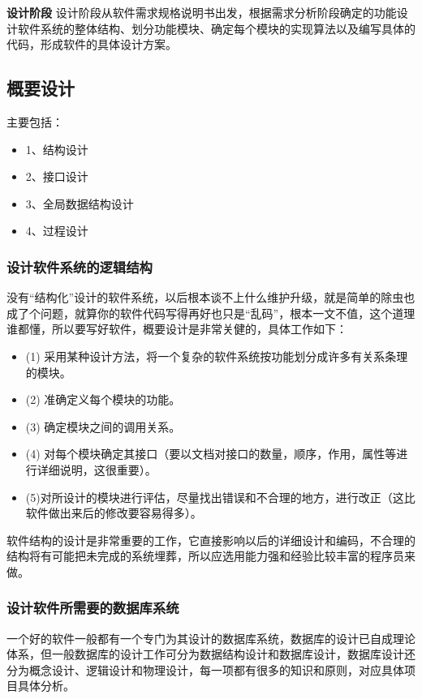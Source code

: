 \documentclass[UTF8,nofonts]{ctexart}
\makeatletter
\renewcommand{\section}{\@startsection{section}{1}{0mm}
  {-\baselineskip}{0.5\baselineskip}{\fontsize{16pt}{16pt}\bf\leftline}}
\makeatother
\begin{document}
\section{\textbf{设计阶段}}
设计阶段从软件需求规格说明书出发，根据需求分析阶段确定的功能设计软件系统的整体结构、划分功能模块、确定每个模块的实现算法以及编写具体的代码，形成软件的具体设计方案。
\subsection{\textbf{概要设计}}
主要包括：
\begin{itemize}
 \setlength{\itemsep}{0pt}
 \setlength{\parskip}{0pt}
 \setlength{\parsep}{0pt}
\item 1、结构设计
\item 2、接口设计
\item	3、全局数据结构设计
\item 4、过程设计
\end{itemize}
\subsubsection{\textbf{设计软件系统的逻辑结构}}
没有“结构化”设计的软件系统，以后根本谈不上什么维护升级，就是简单的除虫也成了个问题，就算你的软件代码写得再好也只是“乱码”，根本一文不值，这个道理谁都懂，所以要写好软件，概要设计是非常关健的，具体工作如下：
\begin{itemize}
 \setlength{\itemsep}{0pt}
 \setlength{\parskip}{0pt}
 \setlength{\parsep}{0pt}
\item (1) 采用某种设计方法，将一个复杂的软件系统按功能划分成许多有关系条理的模块。
\item (2) 准确定义每个模块的功能。
\item (3) 确定模块之间的调用关系。
\item (4) 对每个模块确定其接口（要以文档对接口的数量，顺序，作用，属性等进行详细说明，这很重要）。
\item (5)对所设计的模块进行评估，尽量找出错误和不合理的地方，进行改正（这比软件做出来后的修改要容易得多）。
\end{itemize}
软件结构的设计是非常重要的工作，它直接影响以后的详细设计和编码，不合理的结构将有可能把未完成的系统埋葬，所以应选用能力强和经验比较丰富的程序员来做。
\subsubsection{\textbf{设计软件所需要的数据库系统}}
一个好的软件一般都有一个专门为其设计的数据库系统，数据库的设计已自成理论体系，但一般数据库的设计工作可分为数据结构设计和数据库设计，数据库设计还分为概念设计、逻辑设计和物理设计，每一项都有很多的知识和原则，对应具体项目具体分析。		
\end{document}

